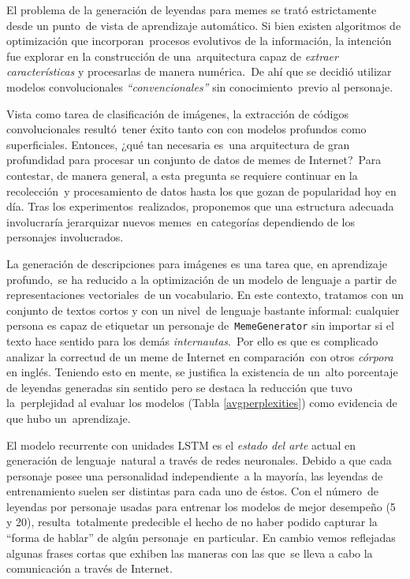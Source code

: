 \noindent
El problema de la generación de leyendas para memes se trató estrictamente desde un punto\
de vista de aprendizaje automático. Si bien existen algoritmos de optimización que incorporan\
procesos evolutivos de la información, la intención fue explorar en la construcción de una\
arquitectura capaz de \emph{extraer características} y procesarlas de manera numérica.\
De ahí que se decidió utilizar modelos convolucionales \emph{``convencionales''} sin conocimiento\
previo al personaje.\par
Vista como tarea de clasificación de imágenes, la extracción de códigos convolucionales resultó\
tener éxito tanto con con modelos profundos como superficiales. Entonces, ¿qué tan necesaria es\
una arquitectura de gran profundidad para procesar un conjunto de datos de memes de Internet?\
Para contestar, de manera general, a esta pregunta se requiere continuar en la recolección\
y procesamiento de datos hasta los que gozan de popularidad hoy en día. Tras los experimentos\
realizados, proponemos que una estructura adecuada involucraría jerarquizar nuevos memes\
en categorías dependiendo de los personajes involucrados.\par
La generación de descripciones para imágenes es una tarea que, en aprendizaje profundo,\
se ha reducido a la optimización de un modelo de lenguaje a partir de representaciones vectoriales\
de un vocabulario. En este contexto, tratamos con un conjunto de textos cortos y con un nivel\
de lenguaje bastante informal: cualquier persona es capaz de etiquetar un personaje de\
\verb+MemeGenerator+ sin importar si el texto hace sentido para los demás \emph{internautas}.\
Por ello es que es complicado analizar la correctud de un meme de Internet en comparación\
con otros \emph{córpora} en inglés. Teniendo esto en mente, se justifica la existencia de un\
alto porcentaje de leyendas generadas sin sentido pero se destaca la reducción que tuvo la\
perplejidad al evaluar los modelos (Tabla \ref{avgperplexities}) como evidencia de que hubo un\
aprendizaje.\par
El modelo recurrente con unidades LSTM es el \emph{estado del arte} actual en generación de lenguaje\
natural a través de redes neuronales. Debido a que cada personaje posee una personalidad independiente\
a la mayoría, las leyendas de entrenamiento suelen ser distintas para cada uno de éstos. Con el número\
de leyendas por personaje usadas para entrenar los modelos de mejor desempeño (5 y 20), resulta\
totalmente predecible el hecho de no haber podido capturar la ``forma de hablar'' de algún personaje\
en particular. En cambio vemos reflejadas algunas frases cortas que exhiben las maneras con las que\
se lleva a cabo la comunicación a través de Internet.

